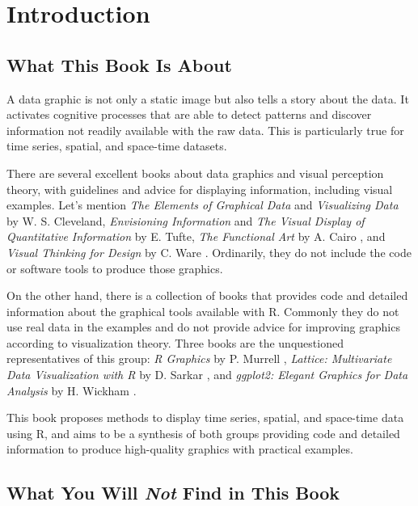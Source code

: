 \chapter{Introduction}

\section{What This Book Is About}
\label{sec:thisBook}

A data graphic is not only a static image but also tells a story about
the data. It activates cognitive processes that are able to detect
patterns and discover information not readily available with the raw
data. This is particularly true for time series, spatial, and
space-time datasets.

There are several excellent books about data graphics and visual
perception theory, with guidelines and advice for displaying
information, including visual examples. Let's mention \emph{The
  Elements of Graphical Data} \cite{Cleveland1994} and
\emph{Visualizing Data} \cite{Cleveland1993} by W. S. Cleveland,
\emph{Envisioning Information} \cite{Tufte1990} and \emph{The Visual
  Display of Quantitative Information} \cite{Tufte2001} by E. Tufte,
\emph{The Functional Art} by A. Cairo \cite{Cairo2012}, and
\emph{Visual Thinking for Design} by C. Ware \cite{Ware2008}.
Ordinarily, they do not include the code or software tools to produce
those graphics.

On the other hand, there is a collection of books that provides code
and detailed information about the graphical tools available with
\textsf{R}. Commonly they do not use real data in the examples and do
not provide advice for improving graphics according to visualization
theory. Three books are the unquestioned representatives of this
group: \emph{R Graphics} by P. Murrell \cite{Murrell2011},
\emph{Lattice: Multivariate Data Visualization with R} by D. Sarkar
\cite{Sarkar2010}, and \emph{ggplot2: Elegant Graphics for Data Analysis} by
H. Wickham \cite{Wickham2009}.

This book proposes methods to display time series, spatial, and
space-time data using \textsf{R}, and aims to be a synthesis of both
groups providing code and detailed information to produce high-quality
graphics with practical examples.

\section{What You Will \emph{Not} Find in This Book}
\label{sec:thisBookIsNot}

